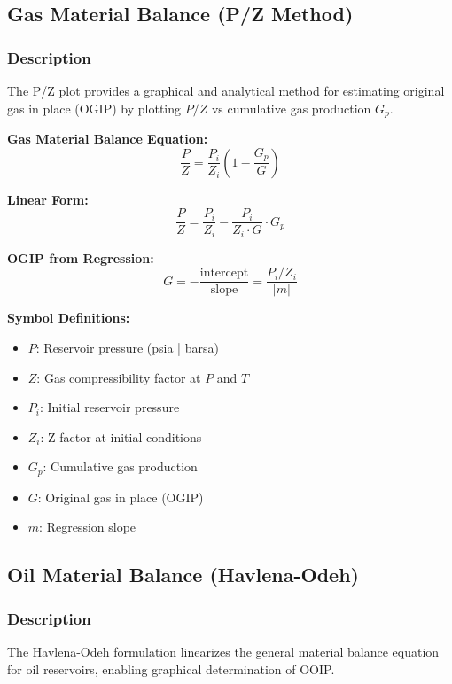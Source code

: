 \documentclass[11pt,a4paper]{article}
\newcommand{\symitem}[2]{\item \textbf{#1}: #2}
\begin{document}
\subsection{Gas Material Balance (P/Z Method)}

\subsubsection{Description}
The P/Z plot provides a graphical and analytical method for estimating original gas in place (OGIP) by plotting $P/Z$ vs cumulative gas production $G_p$.

\begin{tcolorbox}[colback=formulabox,colframe=black!75]
\textbf{Gas Material Balance Equation:}
\begin{equation}
\frac{P}{Z} = \frac{P_i}{Z_i} \left(1 - \frac{G_p}{G}\right)
\end{equation}

\textbf{Linear Form:}
\begin{equation}
\frac{P}{Z} = \frac{P_i}{Z_i} - \frac{P_i}{Z_i \cdot G} \cdot G_p
\end{equation}

\textbf{OGIP from Regression:}
\begin{equation}
G = -\frac{\text{intercept}}{\text{slope}} = \frac{P_i / Z_i}{|m|}
\end{equation}
\end{tcolorbox}

\textbf{Symbol Definitions:}
\begin{itemize}[leftmargin=2cm]
\symitem{$P$}{Reservoir pressure (psia | barsa)}
\symitem{$Z$}{Gas compressibility factor at $P$ and $T$}
\symitem{$P_i$}{Initial reservoir pressure}
\symitem{$Z_i$}{Z-factor at initial conditions}
\symitem{$G_p$}{Cumulative gas production}
\symitem{$G$}{Original gas in place (OGIP)}
\symitem{$m$}{Regression slope}
\end{itemize}

\subsection{Oil Material Balance (Havlena-Odeh)}

\subsubsection{Description}
The Havlena-Odeh formulation linearizes the general material balance equation for oil reservoirs, enabling graphical determination of OOIP.
\end{document}
